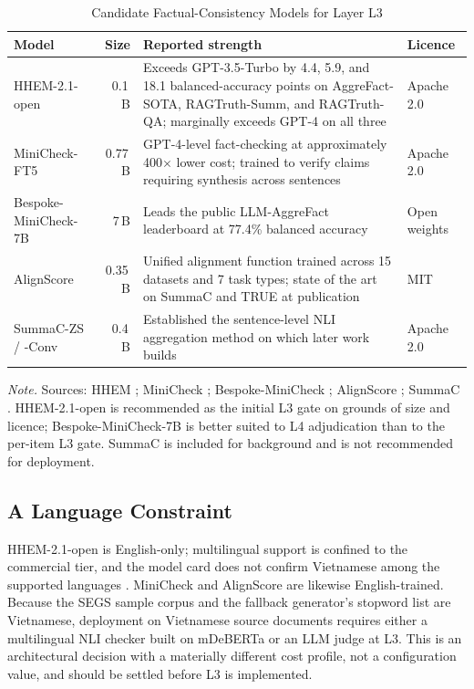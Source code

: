 \documentclass[stu,11pt,floatsintext]{apa7}
\begin{document}
\begin{table}[htbp]
\caption{Candidate Factual-Consistency Models for Layer L3}
\label{tab:verifiers}
\small
\begin{tabular}{@{}l r L{5.4cm} l@{}}
\toprule
Model & Size & Reported strength & Licence \\
\midrule
HHEM-2.1-open & 0.1\,B & Exceeds GPT-3.5-Turbo by 4.4, 5.9, and 18.1 balanced-accuracy points on AggreFact-SOTA, RAGTruth-Summ, and RAGTruth-QA; marginally exceeds GPT-4 on all three & Apache 2.0 \\
\addlinespace
MiniCheck-FT5 & 0.77\,B & GPT-4-level fact-checking at approximately 400$\times$ lower cost; trained to verify claims requiring synthesis across sentences & Apache 2.0 \\
\addlinespace
Bespoke-MiniCheck-7B & 7\,B & Leads the public LLM-AggreFact leaderboard at 77.4\% balanced accuracy & Open weights \\
\addlinespace
AlignScore & 0.35\,B & Unified alignment function trained across 15 datasets and 7 task types; state of the art on SummaC and TRUE at publication & MIT \\
\addlinespace
SummaC-ZS / -Conv & 0.4\,B & Established the sentence-level NLI aggregation method on which later work builds & Apache 2.0 \\
\bottomrule
\end{tabular}
\par\vspace{0.5em}
\footnotesize\textit{Note.} Sources: HHEM \parencite{vectara2024hhem}; MiniCheck
\parencite{tang2024minicheck}; Bespoke-MiniCheck \parencite{bespoke2024minicheck};
AlignScore \parencite{zha2023alignscore}; SummaC \parencite{laban2022summac}.
HHEM-2.1-open is recommended as the initial L3 gate on grounds of size and
licence; Bespoke-MiniCheck-7B is better suited to L4 adjudication than to the
per-item L3 gate. SummaC is included for background and is not recommended for
deployment.
\end{table}

\subsection{A Language Constraint}

HHEM-2.1-open is English-only; multilingual support is confined to the
commercial tier, and the model card does not confirm Vietnamese among the
supported languages \parencite{vectara2024hhem}. MiniCheck and AlignScore are
likewise English-trained. Because the SEGS sample corpus and the fallback
generator's stopword list are Vietnamese, deployment on Vietnamese source
documents requires either a multilingual NLI checker built on mDeBERTa or an LLM
judge at L3. This is an architectural decision with a materially different cost
profile, not a configuration value, and should be settled before L3 is
implemented.
\end{document}
